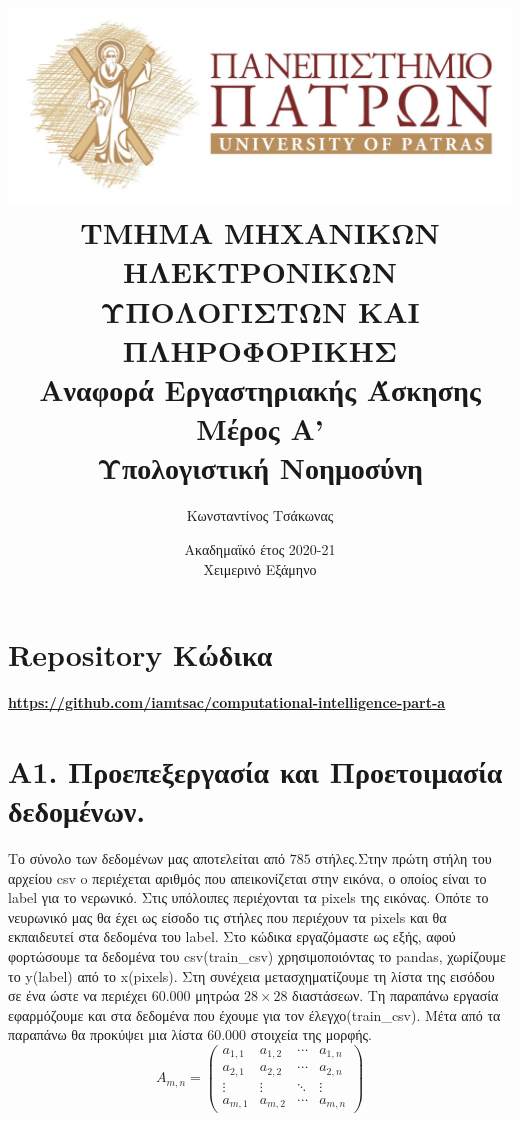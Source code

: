 \documentclass[12pt,a4paper]{report}
\title{{\bf \includegraphics[scale=1.0]{up_landscape.jpg} \\ ΤΜΗΜΑ ΜΗΧΑΝΙΚΩΝ ΗΛΕΚΤΡΟΝΙΚΩΝ ΥΠΟΛΟΓΙΣΤΩΝ ΚΑΙ ΠΛΗΡΟΦΟΡΙΚΗΣ  \\ \vspace{3cm}Αναφορά Εργαστηριακής Άσκησης Μέρος Α' \\ Υπολογιστική Νοημοσύνη}}
\author{Κωνσταντίνος Τσάκωνας}
\date{Ακαδημαϊκό έτος 2020-21\\ Χειμερινό Εξάμηνο}
\begin{document}
 \maketitle \newpage

    \section*{ Repository Κώδικα}
        \underline{\textbf{\url{https://github.com/iamtsac/computational-intelligence-part-a}}}


    \section*{A1. Προεπεξεργασία και Προετοιμασία δεδομένων.} 
        Το σύνολο των δεδομένων μας αποτελείται από $785$ στήλες.Στην πρώτη στήλη του αρχείου csv o περιέχεται αριθμός που απεικονίζεται στην εικόνα, ο οποίος είναι το label για το νερωνικό. Στις υπόλοιπες περιέχονται τα pixels της εικόνας. Οπότε το νευρωνικό μας θα έχει ως είσοδο τις στήλες που περιέχουν τα pixels και θα εκπαιδευτεί στα δεδομένα του label.
        Στο κώδικα εργαζόμαστε ως εξής, αφού φορτώσουμε τα δεδομένα του csv(train\_csv) χρησιμοποιόντας το pandas, χωρίζουμε το y(label) από το x(pixels). Στη συνέχεια μετασχηματίζουμε τη λίστα της εισόδου σε ένα ώστε να περιέχει $60.000$ μητρώα $28\times28$ διαστάσεων. Τη παραπάνω εργασία εφαρμόζουμε και στα δεδομένα που έχουμε για τον έλεγχο(train\_csv). Μέτα από τα παραπάνω θα προκύψει μια λίστα $60.000$ στοιχεία της μορφής. 
\begin{equation*}
A_{m,n} = 
\begin{pmatrix}
a_{1,1} & a_{1,2} & \cdots & a_{1,n} \\
a_{2,1} & a_{2,2} & \cdots & a_{2,n} \\
\vdots  & \vdots  & \ddots & \vdots  \\
a_{m,1} & a_{m,2} & \cdots & a_{m,n} 
\end{pmatrix}
\end{equation*}
\end{document}
